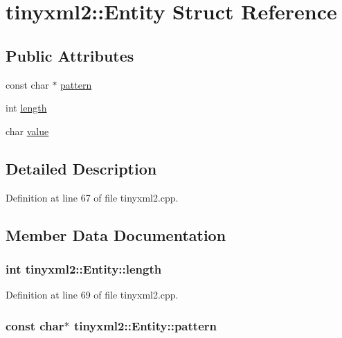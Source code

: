 \hypertarget{structtinyxml2_1_1_entity}{\section{tinyxml2\-:\-:Entity Struct Reference}
\label{structtinyxml2_1_1_entity}
}
\subsection*{Public Attributes}
\begin{DoxyCompactItemize}
\item 
const char $\ast$ \hyperlink{structtinyxml2_1_1_entity_ab330f5d665d29bfc811ecfa76315894b}{pattern}
\item 
int \hyperlink{structtinyxml2_1_1_entity_a25e2b57cb59cb4fa68f283d7cb570f21}{length}
\item 
char \hyperlink{structtinyxml2_1_1_entity_a7334e81e33b4615655a403711b24f3ed}{value}
\end{DoxyCompactItemize}


\subsection{Detailed Description}


Definition at line 67 of file tinyxml2.\-cpp.



\subsection{Member Data Documentation}
\hypertarget{structtinyxml2_1_1_entity_a25e2b57cb59cb4fa68f283d7cb570f21}{
\subsubsection[{length}]{\setlength{\rightskip}{0pt plus 5cm}int tinyxml2\-::\-Entity\-::length}}\label{structtinyxml2_1_1_entity_a25e2b57cb59cb4fa68f283d7cb570f21}


Definition at line 69 of file tinyxml2.\-cpp.

\hypertarget{structtinyxml2_1_1_entity_ab330f5d665d29bfc811ecfa76315894b}{
\subsubsection[{pattern}]{\setlength{\rightskip}{0pt plus 5cm}const char$\ast$ tinyxml2\-::\-Entity\-::pattern}}\label{structtinyxml2_1_1_entity_ab330f5d665d29bfc811ecfa76315894b}



